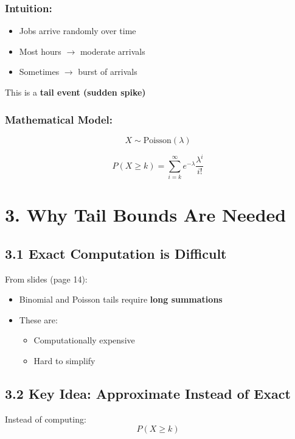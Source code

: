 \documentclass[12pt]{article}
\begin{document}
\subsubsection*{Intuition:}

\begin{itemize}
\item Jobs arrive randomly over time
\item Most hours $\rightarrow$ moderate arrivals
\item Sometimes $\rightarrow$ burst of arrivals
\end{itemize}

This is a \textbf{tail event (sudden spike)} 

\subsubsection*{Mathematical Model:}

\[
X \sim \text{Poisson}(\lambda)
\]

\[
P(X \ge k) = \sum_{i=k}^{\infty} e^{-\lambda} \frac{\lambda^i}{i!}
\]

\section*{3. Why Tail Bounds Are Needed}

\subsection*{3.1 Exact Computation is Difficult}

From slides (page 14):

\begin{itemize}
\item Binomial and Poisson tails require \textbf{long summations}
\item These are:
\begin{itemize}
\item Computationally expensive
\item Hard to simplify
\end{itemize}
\end{itemize}

\subsection*{3.2 Key Idea: Approximate Instead of Exact}

Instead of computing:
\[
P(X \ge k)
\]
\end{document}
